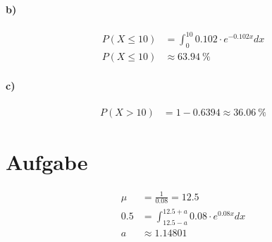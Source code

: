 \documentclass[12pt,a4paper]{report}
\begin{document}
	\paragraph{b)}
	\begin{align*}
		P(X \leq 10) &= \int_{0}^{10} 0.102 \cdot e^{-0.102x} dx \\
		P(X \leq 10) &\approx 63.94\ \%
	\end{align*}
	\paragraph{c)}
	\begin{align*}
		P(X > 10) &= 1- 0.6394 \approx 36.06\ \%
	\end{align*}
	\section{Aufgabe}
	\begin{align*}
		\mu &= \frac{1}{0.08} = 12.5 \\
		0.5 &= \int_{12.5-a}^{12.5+a} 0.08 \cdot e^{0.08x} dx \\
		a &\approx 1.14801
	\end{align*}
\end{document}
